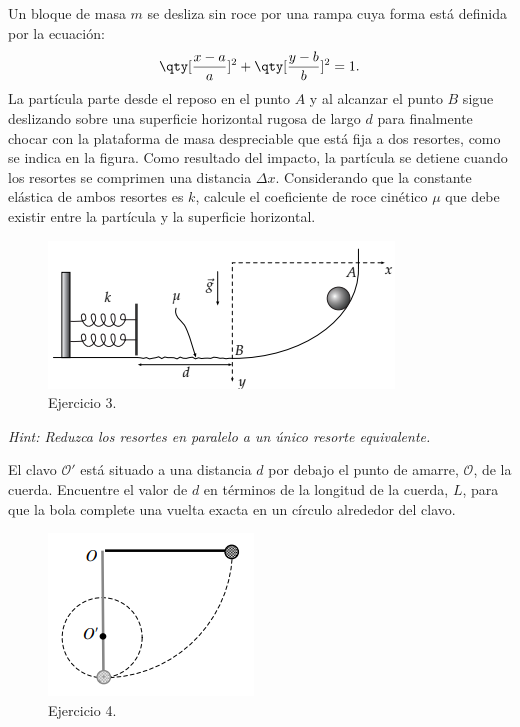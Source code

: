 \begin{mdframed}[style=warning]
	\begin{ejercicio}
		Un bloque de masa $m$ se desliza sin roce por una rampa cuya forma está definida por la ecuación:
			$$ \qty[\frac{x - a}{a}]^2 + \qty[\frac{y - b}{b}]^2 = 1. $$
		La partícula parte desde el reposo en el punto $A$ y al alcanzar el punto $B$ sigue deslizando sobre una superficie horizontal rugosa de largo $d$ para finalmente chocar con la plataforma de masa despreciable que está fija a dos resortes, como se indica en la figura. Como resultado del impacto, la partícula se detiene cuando los resortes se comprimen una distancia $\Delta x$. Considerando que la constante elástica de ambos resortes es $k$, calcule el coeficiente de roce cinético $\mu$ que debe existir entre la partícula y la superficie horizontal.
		\begin{figure}[H]
			\centering
			\includegraphics[scale=0.5]{./img/p1.png}
			\caption{Ejercicio 3.}
		\end{figure}
	\end{ejercicio}
	\noindent \textit{Hint: Reduzca los resortes en paralelo a un único resorte equivalente.}
\end{mdframed}










\begin{mdframed}[style=warning]
	\begin{ejercicio}
		El clavo $\mathcal{O}'$ está situado a una distancia $d$ por debajo el punto de amarre, $\mathcal{O}$, de la cuerda. Encuentre el valor de $d$ en términos de la longitud de la cuerda, $L$, para que la bola complete una vuelta exacta en un círculo alrededor del clavo.
		\begin{figure}[H]
			\centering
			\includegraphics[scale=0.5]{./img/p2.png}
			\caption{Ejercicio 4.}
		\end{figure}
	\end{ejercicio}
\end{mdframed}












